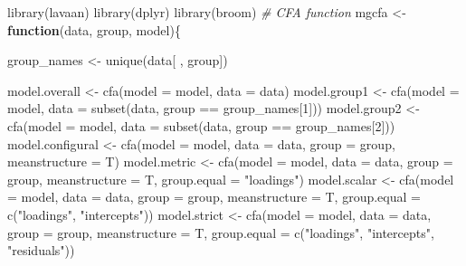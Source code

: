 \documentclass[
  man]{apa6}
\newenvironment{Shaded}{\begin{snugshade}}{\end{snugshade}}
\newcommand{\AttributeTok}[1]{\textcolor[rgb]{0.77,0.63,0.00}{#1}}
\newcommand{\CommentTok}[1]{\textcolor[rgb]{0.56,0.35,0.01}{\textit{#1}}}
\newcommand{\ControlFlowTok}[1]{\textcolor[rgb]{0.13,0.29,0.53}{\textbf{#1}}}
\newcommand{\DecValTok}[1]{\textcolor[rgb]{0.00,0.00,0.81}{#1}}
\newcommand{\FunctionTok}[1]{\textcolor[rgb]{0.00,0.00,0.00}{#1}}
\newcommand{\NormalTok}[1]{#1}
\newcommand{\OtherTok}[1]{\textcolor[rgb]{0.56,0.35,0.01}{#1}}
\newcommand{\SpecialCharTok}[1]{\textcolor[rgb]{0.00,0.00,0.00}{#1}}
\newcommand{\StringTok}[1]{\textcolor[rgb]{0.31,0.60,0.02}{#1}}
\begin{document}
\begin{Shaded}
\begin{Highlighting}[]
\FunctionTok{library}\NormalTok{(lavaan)}
\FunctionTok{library}\NormalTok{(dplyr)}
\FunctionTok{library}\NormalTok{(broom)}
\CommentTok{\# CFA function}
\NormalTok{mgcfa }\OtherTok{\textless{}{-}} \ControlFlowTok{function}\NormalTok{(data, group, model)\{}
  
\NormalTok{  group\_names }\OtherTok{\textless{}{-}} \FunctionTok{unique}\NormalTok{(data[ , group])}
  
\NormalTok{  model.overall }\OtherTok{\textless{}{-}} \FunctionTok{cfa}\NormalTok{(}\AttributeTok{model =}\NormalTok{ model, }\AttributeTok{data =}\NormalTok{ data)}
\NormalTok{  model.group1 }\OtherTok{\textless{}{-}} \FunctionTok{cfa}\NormalTok{(}\AttributeTok{model =}\NormalTok{ model, }
                      \AttributeTok{data =} \FunctionTok{subset}\NormalTok{(data, group }\SpecialCharTok{==}\NormalTok{ group\_names[}\DecValTok{1}\NormalTok{]))}
\NormalTok{  model.group2 }\OtherTok{\textless{}{-}} \FunctionTok{cfa}\NormalTok{(}\AttributeTok{model =}\NormalTok{ model, }
                      \AttributeTok{data =} \FunctionTok{subset}\NormalTok{(data, group }\SpecialCharTok{==}\NormalTok{ group\_names[}\DecValTok{2}\NormalTok{]))}
\NormalTok{  model.configural }\OtherTok{\textless{}{-}} \FunctionTok{cfa}\NormalTok{(}\AttributeTok{model =}\NormalTok{ model, }\AttributeTok{data =}\NormalTok{ data, }
                          \AttributeTok{group =}\NormalTok{ group, }\AttributeTok{meanstructure =}\NormalTok{ T)}
\NormalTok{  model.metric }\OtherTok{\textless{}{-}} \FunctionTok{cfa}\NormalTok{(}\AttributeTok{model =}\NormalTok{ model, }\AttributeTok{data =}\NormalTok{ data, }
                      \AttributeTok{group =}\NormalTok{ group, }\AttributeTok{meanstructure =}\NormalTok{ T,}
                      \AttributeTok{group.equal =} \StringTok{"loadings"}\NormalTok{)}
\NormalTok{  model.scalar }\OtherTok{\textless{}{-}} \FunctionTok{cfa}\NormalTok{(}\AttributeTok{model =}\NormalTok{ model, }\AttributeTok{data =}\NormalTok{ data, }
                      \AttributeTok{group =}\NormalTok{ group, }\AttributeTok{meanstructure =}\NormalTok{ T, }
                      \AttributeTok{group.equal =} \FunctionTok{c}\NormalTok{(}\StringTok{"loadings"}\NormalTok{, }\StringTok{"intercepts"}\NormalTok{))}
\NormalTok{  model.strict }\OtherTok{\textless{}{-}} \FunctionTok{cfa}\NormalTok{(}\AttributeTok{model =}\NormalTok{ model, }\AttributeTok{data =}\NormalTok{ data, }
                      \AttributeTok{group =}\NormalTok{ group, }\AttributeTok{meanstructure =}\NormalTok{ T, }
                      \AttributeTok{group.equal =}  \FunctionTok{c}\NormalTok{(}\StringTok{"loadings"}\NormalTok{, }\StringTok{"intercepts"}\NormalTok{, }\StringTok{"residuals"}\NormalTok{))}
  

\end{Highlighting}
\end{Shaded}
\end{document}

